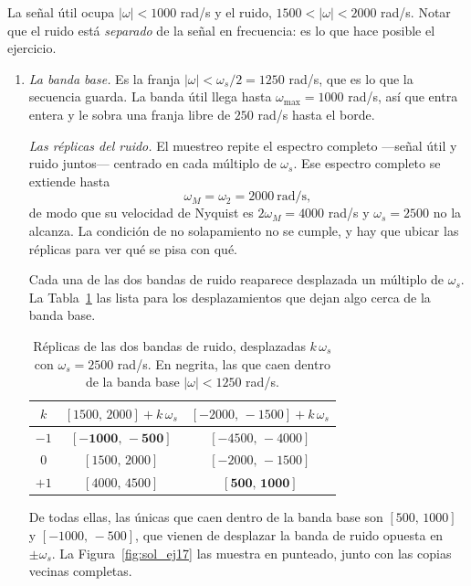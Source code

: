 \documentclass[10pt,a4paper]{article}
\begin{document}
	La señal útil ocupa $|\omega| < 1000$ rad/s y el ruido, $1500 < |\omega| < 2000$ rad/s.
	Notar que el ruido está \emph{separado} de la señal en frecuencia: es lo que hace
	posible el ejercicio.

	\begin{enumerate}
		\item \emph{La banda base.} Es la franja $|\omega| < \omega_s/2 = 1250$ rad/s, que es lo que
		la secuencia guarda. La banda útil llega hasta $\omega_{\max} = 1000$ rad/s, así que
		entra entera y le sobra una franja libre de $250$ rad/s hasta el borde.

		\emph{Las réplicas del ruido.} El muestreo repite el espectro completo ---señal útil y
		ruido juntos--- centrado en cada múltiplo de $\omega_s$. Ese espectro completo se
		extiende hasta
		\[
			\omega_M = \omega_2 = 2000\ \text{rad/s},
		\]
		de modo que su velocidad de Nyquist es $2\omega_M = 4000$ rad/s y $\omega_s = 2500$ no
		la alcanza. La condición de no solapamiento no se cumple, y hay que ubicar las réplicas
		para ver qué se pisa con qué.

		Cada una de las dos bandas de ruido reaparece desplazada un múltiplo de $\omega_s$. La
		Tabla~\ref{tab:sol_ej17} las lista para los desplazamientos que dejan algo cerca de la
		banda base.

		\begin{table}[H]
			\centering
			\caption{Réplicas de las dos bandas de ruido, desplazadas $k\,\omega_s$ con
			$\omega_s = 2500$ rad/s. En negrita, las que caen dentro de la banda base
			$|\omega| < 1250$ rad/s.}
			\label{tab:sol_ej17}
			\begin{tabular}{ccc}
				\toprule
				$k$ & $[1500,\,2000] + k\,\omega_s$ & $[-2000,\,-1500] + k\,\omega_s$ \\
				\midrule
				$-1$ & $\mathbf{[-1000,\,-500]}$ & $[-4500,\,-4000]$ \\
				$0$  & $[1500,\,2000]$           & $[-2000,\,-1500]$ \\
				$+1$ & $[4000,\,4500]$           & $\mathbf{[500,\,1000]}$ \\
				\bottomrule
			\end{tabular}
		\end{table}

		De todas ellas, las únicas que caen dentro de la banda base son $[500,\,1000]$ y
		$[-1000,\,-500]$, que vienen de desplazar la banda de ruido opuesta en $\pm\omega_s$.
		La Figura~\ref{fig:sol_ej17} las muestra en punteado, junto con las copias vecinas
		completas.


\end{enumerate}
\end{document}

